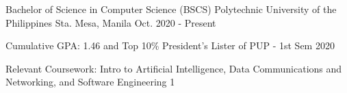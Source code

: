 

\begin{cventries}

  \cventry
    {Bachelor of Science in Computer Science (BSCS)} %
    {Polytechnic University of the Philippines} %
    {Sta. Mesa, Manila} %
    {Oct. 2020 - Present} %
    {
      \begin{cvitems} %
        \item {Cumulative GPA: 1.46 and Top 10\% President's Lister of PUP - 1st Sem 2020}
        \item {Relevant Coursework: Intro to Artificial Intelligence, Data Communications and Networking, and Software Engineering 1}
      \end{cvitems}
    }

\end{cventries}
